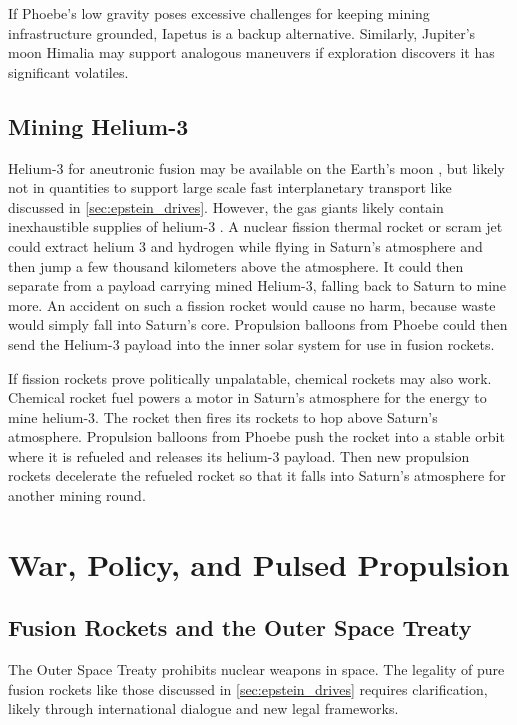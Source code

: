 \documentclass{article}
\begin{document}
If Phoebe’s low gravity poses excessive challenges for keeping mining infrastructure grounded, Iapetus is a backup alternative. Similarly, Jupiter’s moon Himalia may support analogous maneuvers if exploration discovers  it has significant volatiles.  

\subsection{Mining Helium-3}
Helium-3 for aneutronic fusion may be available on the Earth's moon \cite{esa_helium3_mining}, but likely not in quantities to support large scale fast interplanetary transport like discussed in \autoref{sec:epstein_drives}.   However, the gas giants likely contain inexhaustible supplies of helium-3 \cite{palaszewski2005atmospheric}.   A nuclear fission thermal rocket or scram jet could extract helium 3 and hydrogen while flying in Saturn's atmosphere and then jump a few thousand kilometers above the atmosphere.  It could then separate from a payload carrying mined Helium-3, falling back to Saturn to mine more.  An accident on such a fission rocket would cause no harm, because waste would simply fall into Saturn's core. Propulsion balloons from Phoebe could then send the Helium-3 payload into the inner solar system for use in fusion rockets.  

If fission rockets prove politically unpalatable, chemical rockets may also work.   Chemical rocket fuel powers a motor in Saturn's atmosphere for the energy to mine helium-3.  The rocket then fires its rockets to hop above Saturn's atmosphere.   Propulsion balloons from Phoebe push the rocket into a stable orbit where it is refueled and releases its helium-3 payload.  Then new propulsion rockets decelerate the refueled rocket so that it falls into Saturn's atmosphere for another mining round.


\section{War, Policy, and Pulsed Propulsion}
\subsection{Fusion Rockets and the Outer Space Treaty}
The Outer Space Treaty \cite{outer_space_treaty}prohibits nuclear weapons in space. The legality of pure fusion rockets like those discussed in \autoref{sec:epstein_drives} requires clarification, likely through international dialogue and new legal frameworks.
\end{document}
